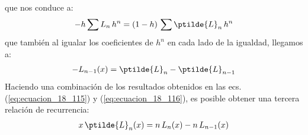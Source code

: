 que nos conduce a:
\begin{align*}
- h \sum L_{n} \, h^{n} =  (1 - h) \, \sum \ptilde{L}_{n} \, h^{n}
\end{align*}
que también al igualar los coeficientes de $h^{n}$ en cada lado de la igualdad, llegamos a:
\begin{align}
- L_{n-1} (x) = \ptilde{L}_{n} - \ptilde{L}_{n-1}
\label{eq:ecuacion_18_116}
\end{align}
Haciendo una combinación de los resultados obtenidos en las ecs. (\ref{eq:ecuacion_18_115}) y (\ref{eq:ecuacion_18_116}), es posible obtener una tercera relación de recurrencia:
\begin{align}
x \, \ptilde{L}_{n} (x) = n \, L_{n} (x) - n \, L_{n-1} (x)
\label{eq:ecuacion_18_117}
\end{align}
